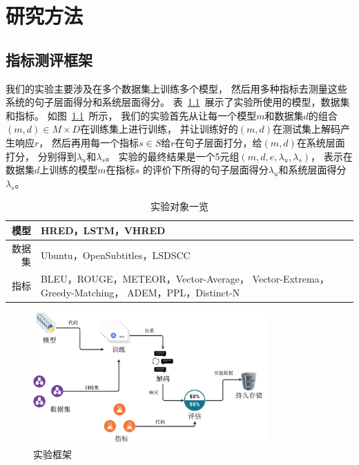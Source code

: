 
\chapter{研究方法}\label{ch:method}

\section{指标测评框架}\label{sec:eval_framework}
我们的实验主要涉及在多个数据集上训练多个模型，
然后用多种指标去测量这些系统的句子层面得分和系统层面得分。
表~\ref{tab:experiment_triples}~展示了实验所使用的模型，数据集和指标。
如图~\ref{fig:framework}~所示，
我们的实验首先从让每一个模型$m$和数据集$d$的组合
$(m, d) \in M \times D$在训练集上进行训练，
并让训练好的$(m, d)$在测试集上解码产生响应$r$，
然后再用每一个指标$s \in S$给$r$在句子层面打分，给$(m, d)$在系统层面打分，
分别得到$\lambda_{u}$和$\lambda_{s}$。
实验的最终结果是一个5元组$(m, d, e, \lambda_{u}, \lambda_{s})$，
表示在数据集$d$上训练的模型$m$在指标$s$
的评价下所得的句子层面得分$\lambda_u$和系统层面得分$\lambda_s$。

\begin{table}[H]
    \centering
    \caption{实验对象一览}
    \label{tab:experiment_triples}
    \begin{tabular}{|r|m{}|}
        \hline
        模型 & HRED，LSTM，VHRED \\
        \hline
        数据集 & Ubuntu，OpenSubtitles，LSDSCC \\
        \hline
        指标 & BLEU，ROUGE，METEOR，Vector-Average，
        Vector-Extrema，Greedy-Matching，
        ADEM，PPL，Distinct-N \\
        \hline
    \end{tabular}
\end{table}

\begin{figure}[H]
    \centering
    \includegraphics[width=0.8\textwidth]{figure/drawio/eval_v4.pdf}
    \caption{实验框架}
    \label{fig:framework}
\end{figure}

